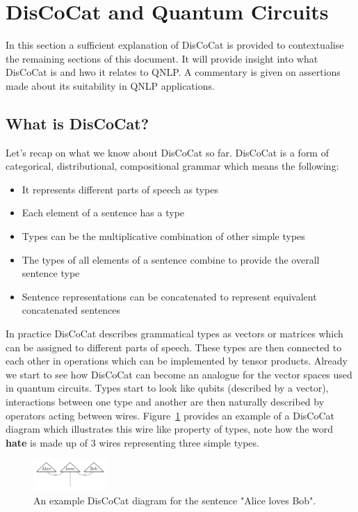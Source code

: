 \documentclass[a4paper,twocolumn,11pt]{quantumarticle}
\begin{document}
    \section{DisCoCat and Quantum Circuits}\label{sec:discocat_circuits}
    In this section a sufficient explanation of DisCoCat is provided to contextualise the remaining
    sections of this document.
    It will provide insight into what DisCoCat is and hwo it relates to QNLP.
    A commentary is given on assertions made about its suitability in QNLP applications.
    \subsection{What is DisCoCat?}\label{subsec:what-is-discocat}
    Let's recap on what we know about DisCoCat so far.
    DisCoCat is a form of categorical, distributional, compositional grammar\cite{discocat} which means the following:
    \begin{itemize}
        \item It represents different parts of speech as types
        \item Each element of a sentence has a type
        \item Types can be the multiplicative combination of other simple types
        \item The types of all elements of a sentence combine to provide the overall sentence type
        \item Sentence representations can be concatenated to represent equivalent concatenated sentences
    \end{itemize}
    \newline
    In practice DisCoCat describes grammatical types as vectors or matrices which can be assigned to different parts
    of speech\cite{qnlp_in_prac}.
    These types are then connected to each other in operations which can be implemented by tensor products\cite{qnlp_in_prac}.
    Already we start to see how DisCoCat can become an analogue for the vector spaces used in quantum circuits.
    Types start to look like qubits (described by a vector), interactions between one type and another are then naturally
    described by operators acting between wires.
    Figure~\ref{fig:discocat-diagram} provides an example of a DisCoCat diagram which illustrates this wire like property
    of types, note how the word \textbf{hate} is made up of 3 wires representing three simple types.
    \begin{figure}[h]
        \centering
        \includegraphics[width=0.25\textwidth]{alicelovesbob}
        \caption{An example DisCoCat diagram for the sentence "Alice loves Bob".}
        \label{fig:discocat-diagram}
    \end{figure}
\end{document}
